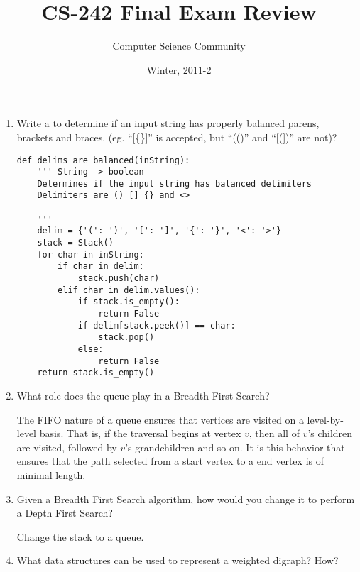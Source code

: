 \documentclass[11pt]{article}
\author{Computer Science Community}
\title{CS-242 Final Exam Review}
\date{Winter, 2011-2}
\makeatletter
\newenvironment{answer}{\large\lstset{basicstyle=\large}\color{white}}{}
\newenvironment{answer}{\large\lstset{basicstyle=\large}\color{red}}{}
\let\thetitle\@title
\let\thedate\@date
\makeatother
\begin{document}
\noindent{\Large \thetitle \hfill \thedate}

\begin{enumerate}

\item Write a  to determine if an input string has properly balanced parens,
      brackets and braces. (eg. ``[\{\}]'' is accepted, but ``(()'' and
      ``[(])'' are not)?

    \begin{answer}
    \begin{lstlisting} 
def delims_are_balanced(inString):
    ''' String -> boolean
    Determines if the input string has balanced delimiters
    Delimiters are () [] {} and <>  
    
    '''
    delim = {'(': ')', '[': ']', '{': '}', '<': '>'}
    stack = Stack()
    for char in inString:
        if char in delim:
            stack.push(char)
        elif char in delim.values():
            if stack.is_empty():
                return False
            if delim[stack.peek()] == char:
                stack.pop()
            else:
                return False
    return stack.is_empty()
    \end{lstlisting}
    \end{answer}

\item What role does the queue play in a Breadth First Search?

    \begin{answer}
    The FIFO nature of a queue ensures that vertices are visited on a level-by-level basis. That is, if the traversal 
    begins at vertex $v$, then all of $v$'s children are visited, followed by $v$'s grandchildren and so on. It is
    this behavior that ensures that the path selected from a start vertex to a end vertex is of minimal length.
    \end{answer}

\item Given a Breadth First Search algorithm, how would you change it to
      perform a Depth First Search?

    \begin{answer}
    Change the stack to a queue.
    \end{answer}

\item What data structures can be used to represent a weighted  digraph? How?


\end{enumerate}
\end{document}

